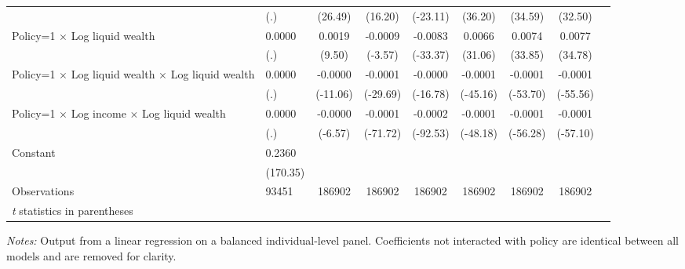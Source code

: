 \begin{table}[h!tbp]
\begin{tabular}{p{1.2in}l*{7}{c}}
                    &         (.)&     (26.49)&     (16.20)&    (-23.11)&     (36.20)&     (34.59)&     (32.50)\\
[1em]
Policy=1 $\times$ Log liquid wealth&      0.0000&      0.0019&     -0.0009&     -0.0083&      0.0066&      0.0074&      0.0077\\
                    &         (.)&      (9.50)&     (-3.57)&    (-33.37)&     (31.06)&     (33.85)&     (34.78)\\
[1em]
Policy=1 $\times$ Log liquid wealth $\times$ Log liquid wealth&      0.0000&     -0.0000&     -0.0001&     -0.0000&     -0.0001&     -0.0001&     -0.0001\\
                    &         (.)&    (-11.06)&    (-29.69)&    (-16.78)&    (-45.16)&    (-53.70)&    (-55.56)\\
[1em]
Policy=1 $\times$ Log income $\times$ Log liquid wealth&      0.0000&     -0.0000&     -0.0001&     -0.0002&     -0.0001&     -0.0001&     -0.0001\\
                    &         (.)&     (-6.57)&    (-71.72)&    (-92.53)&    (-48.18)&    (-56.28)&    (-57.10)\\
[1em]
Constant            &      0.2360&      &    &    &    &    & \\
                    &    (170.35)&    &    &    &    &    & \\
\hline
Observations        &       93451&      186902&      186902&      186902&      186902&      186902&      186902\\
\hline\hline
\multicolumn{8}{l}{\footnotesize \textit{t} statistics in parentheses}\\
\end{tabular}
\textit{Notes:} Output from a linear regression on a balanced individual-level panel. Coefficients not interacted with policy are identical between all models and are removed for clarity.
\end{table}
